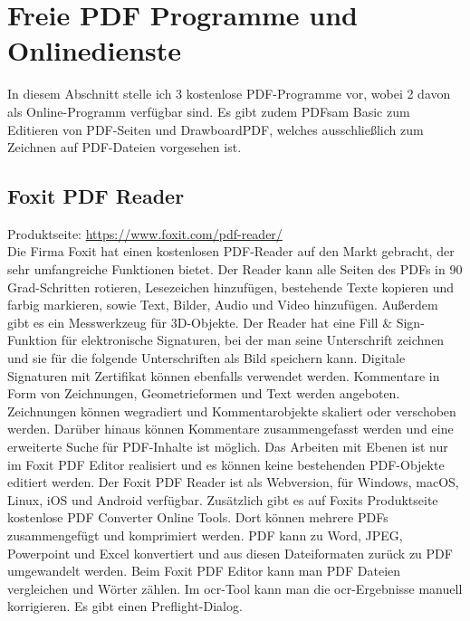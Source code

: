 \section{Freie PDF Programme und Onlinedienste}
In diesem Abschnitt stelle ich 3 kostenlose PDF-Programme vor, wobei 2 davon als Online-Programm verfügbar sind. Es gibt zudem PDFsam Basic zum Editieren von PDF-Seiten und DrawboardPDF, welches ausschließlich zum Zeichnen auf PDF-Dateien vorgesehen ist.

\subsection{Foxit PDF Reader}
Produktseite: \url{https://www.foxit.com/pdf-reader/} \\
Die Firma Foxit hat einen kostenlosen PDF-Reader auf den Markt gebracht, der sehr umfangreiche Funktionen bietet. Der Reader kann alle Seiten des PDFs in 90 Grad-Schritten rotieren, Lesezeichen hinzufügen, bestehende Texte kopieren und farbig markieren, sowie Text, Bilder, Audio und Video hinzufügen. Außerdem gibt es ein Messwerkzeug für 3D-Objekte. Der Reader hat eine Fill \& Sign-Funktion für elektronische Signaturen, bei der man seine Unterschrift zeichnen und sie für die folgende Unterschriften als Bild speichern kann. Digitale Signaturen mit Zertifikat können ebenfalls verwendet werden. Kommentare in Form von Zeichnungen, Geometrieformen und Text werden angeboten. Zeichnungen können wegradiert und Kommentarobjekte skaliert oder verschoben werden. Darüber hinaus können Kommentare zusammengefasst werden und eine erweiterte Suche für PDF-Inhalte ist möglich. Das Arbeiten mit Ebenen ist nur im Foxit PDF Editor realisiert und es können keine bestehenden PDF-Objekte editiert werden. Der Foxit PDF Reader ist als Webversion, für Windows, macOS, Linux, iOS und Android verfügbar. Zusätzlich gibt es auf Foxits Produktseite kostenlose PDF Converter Online Tools. Dort können mehrere PDFs zusammengefügt und komprimiert werden. PDF kann zu Word, JPEG, Powerpoint und Excel konvertiert und aus diesen Dateiformaten zurück zu PDF umgewandelt werden. Beim Foxit PDF Editor kann man PDF Dateien vergleichen und Wörter zählen. Im \gls{ocr}-Tool kann man die \gls{ocr}-Ergebnisse manuell korrigieren. Es gibt einen Preflight-Dialog. 
\par
